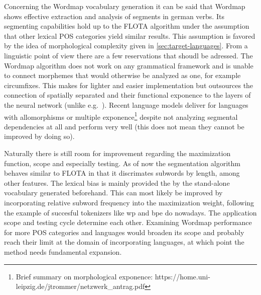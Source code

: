 Concerning the Wordmap vocabulary generation it can be said that Wordmap shows effective extraction and analysis of segments in german verbs.
Its segmenting capabilities hold up to the FLOTA algorithm under the assumption that other lexical POS categories yield similar results.
This assumption is favored by the idea of morphological complexity given in \autoref{sec:target-languages}.
From a linguistic point of view there are a few reservations that shoudl be adressed.
The Wordmap algorithm does not work on any grammatical framework and is unable to connect morphemes that would otherwise be analyzed as one, for example circumfixes.
This makes for lighter and easier implementation but outsources the connection of spatially separated and their functional exponence to the layers of the neural network (unlike e.g.\ \textcite{BITE}).
Recent language models deliver for languages with allomorphisms or multiple exponence\footnote{Brief summary on morphological exponence: https://home.uni-leipzig.de/jtrommer/netzwerk_antrag.pdf} despite not analyzing segmental dependencies at all and perform very well (this does not mean they cannot be improved by doing so).


Naturally there is still room for improvement regarding the maximization function, scope and especially testing.
As of now the segmentation algorithm behaves similar to FLOTA in that it discrimates subwords by length, among other features.
The lexical bias is mainly provided the by the stand-alone vocabulary generated beforehand.
This can most likely be improved by incorporating relative subword frequency into the maximization weight, following the example of succesful tokenizers like \ac{wp} and \ac{bpe} do nowadays.
The application scope and testing cycle determine each other.
Examining Wordmap performance for more POS categories and languages would broaden its scope and probably reach their limit at the domain of incorporating languages, at which point the method needs fundamental expansion.